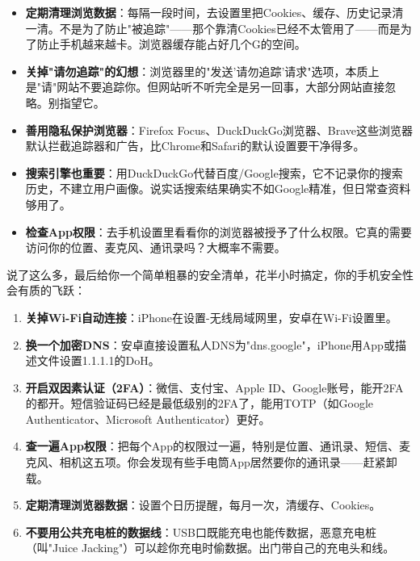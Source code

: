 \begin{itemize}
  \item \textbf{定期清理浏览数据}：每隔一段时间，去设置里把Cookies、缓存、历史记录清一清。不是为了防止"被追踪"——那个靠清Cookies已经不太管用了——而是为了防止手机越来越卡。浏览器缓存能占好几个G的空间。
  \item \textbf{关掉"请勿追踪"的幻想}：浏览器里的"发送'请勿追踪'请求"选项，本质上是"请"网站不要追踪你。但网站听不听完全是另一回事，大部分网站直接忽略。别指望它。
  \item \textbf{善用隐私保护浏览器}：Firefox Focus、DuckDuckGo浏览器、Brave这些浏览器默认拦截追踪器和广告，比Chrome和Safari的默认设置要干净得多。
  \item \textbf{搜索引擎也重要}：用DuckDuckGo代替百度/Google搜索，它不记录你的搜索历史，不建立用户画像。说实话搜索结果确实不如Google精准，但日常查资料够用了。
  \item \textbf{检查App权限}：去手机设置里看看你的浏览器被授予了什么权限。它真的需要访问你的位置、麦克风、通讯录吗？大概率不需要。
\end{itemize}


说了这么多，最后给你一个简单粗暴的安全清单，花半小时搞定，你的手机安全性会有质的飞跃：

\begin{enumerate}
  \item \textbf{关掉Wi-Fi自动连接}：iPhone在设置-无线局域网里，安卓在Wi-Fi设置里。
  \item \textbf{换一个加密DNS}：安卓直接设置私人DNS为"dns.google"，iPhone用App或描述文件设置1.1.1.1的DoH。
  \item \textbf{开启双因素认证（2FA）}：微信、支付宝、Apple ID、Google账号，能开2FA的都开。短信验证码已经是最低级别的2FA了，能用TOTP（如Google Authenticator、Microsoft Authenticator）更好。
  \item \textbf{查一遍App权限}：把每个App的权限过一遍，特别是位置、通讯录、短信、麦克风、相机这五项。你会发现有些手电筒App居然要你的通讯录——赶紧卸载。
  \item \textbf{定期清理浏览器数据}：设置个日历提醒，每月一次，清缓存、Cookies。
  \item \textbf{不要用公共充电桩的数据线}：USB口既能充电也能传数据，恶意充电桩（叫"Juice Jacking"）可以趁你充电时偷数据。出门带自己的充电头和线。
\end{enumerate}

